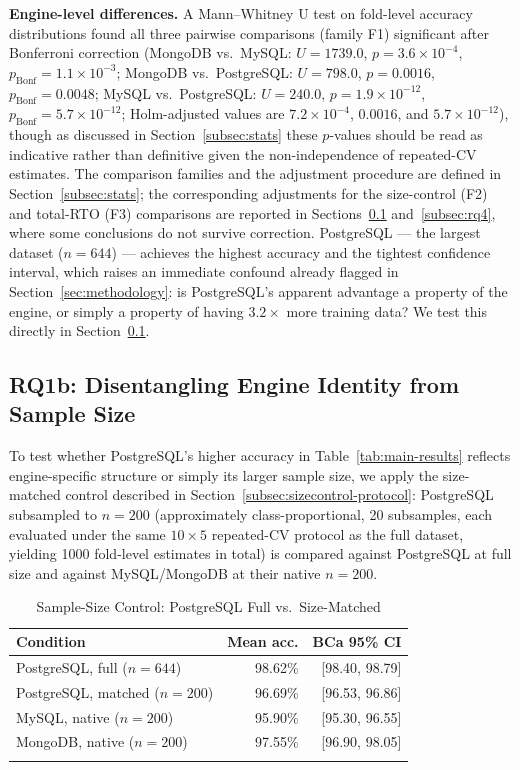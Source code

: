 \documentclass[iicol,pdflatex,sn-mathphys-num]{sn-jnl}
\theoremstyle{thmstyleone}
\theoremstyle{thmstylethree}
\begin{document}
\textbf{Engine-level differences.} A Mann--Whitney U test on
fold-level accuracy distributions found all three pairwise comparisons
(family F1) significant after Bonferroni correction (MongoDB vs.\
MySQL: $U=1739.0$, $p=3.6\times10^{-4}$,
$p_{\text{Bonf}}=1.1\times10^{-3}$; MongoDB vs.\ PostgreSQL:
$U=798.0$, $p=0.0016$, $p_{\text{Bonf}}=0.0048$; MySQL vs.\
PostgreSQL: $U=240.0$, $p=1.9\times10^{-12}$,
$p_{\text{Bonf}}=5.7\times10^{-12}$; Holm-adjusted values are
$7.2\times10^{-4}$, $0.0016$, and $5.7\times10^{-12}$), though as
discussed in Section~\ref{subsec:stats} these $p$-values should be read
as indicative rather than definitive given the non-independence of
repeated-CV estimates. The comparison families and the adjustment
procedure are defined in Section~\ref{subsec:stats}; the corresponding
adjustments for the size-control (F2) and total-RTO (F3) comparisons are
reported in Sections~\ref{subsec:rq1b} and~\ref{subsec:rq4}, where some
conclusions do not survive correction.
PostgreSQL --- the largest dataset
($n=644$) --- achieves the highest accuracy and the tightest
confidence interval, which raises an immediate confound already
flagged in Section~\ref{sec:methodology}: is PostgreSQL's apparent
advantage a property of the engine, or simply a property of having
$3.2\times$ more training data? We test this directly in
Section~\ref{subsec:rq1b}.

\subsection{RQ1b: Disentangling Engine Identity from Sample Size}\label{subsec:rq1b}

To test whether PostgreSQL's higher accuracy in
Table~\ref{tab:main-results} reflects engine-specific structure or
simply its larger sample size, we apply the size-matched control
described in Section~\ref{subsec:sizecontrol-protocol}: PostgreSQL
subsampled to $n=200$ (approximately class-proportional, 20 subsamples, each
evaluated under the same $10\times5$ repeated-CV protocol as the full
dataset, yielding 1000 fold-level estimates in total) is compared
against PostgreSQL at full size and against MySQL/MongoDB at their
native $n=200$.

\begin{table}[h]
\caption{Sample-Size Control: PostgreSQL Full vs.\ Size-Matched}\label{tab:size-control}
\footnotesize
\begin{tabular}{@{}lrr@{}}
\toprule
Condition & Mean acc. & BCa 95\% CI \\
\midrule
PostgreSQL, full ($n=644$)         & 98.62\% & [98.40, 98.79] \\
PostgreSQL, matched ($n=200$)      & 96.69\% & [96.53, 96.86] \\
MySQL, native ($n=200$)            & 95.90\% & [95.30, 96.55] \\
MongoDB, native ($n=200$)          & 97.55\% & [96.90, 98.05] \\
\botrule
\end{tabular}
\end{table}
\end{document}
